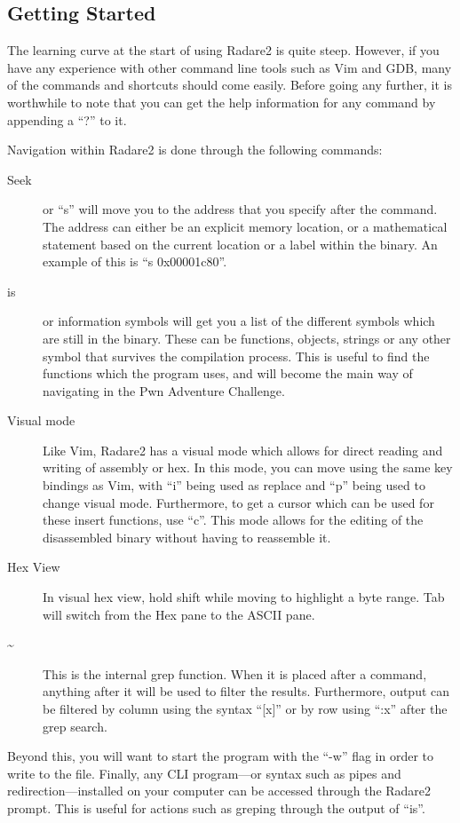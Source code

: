 \documentclass[a4paper,11pt]{report}
\begin{document}
		\subsection{Getting Started}
			The learning curve at the start of using Radare2 is quite steep. 
			However, if you have any experience with other command line tools such as Vim and GDB, many of the commands and shortcuts should come easily. 
			Before going any further, it is worthwhile to note that you can get the help information for any command by appending a ``?'' to it. 

			Navigation within Radare2 is done through the following commands:
			\begin{description}
				\item[Seek]
					or ``s'' will move you to the address that you specify after the command. 
					The address can either be an explicit memory location, or a mathematical statement based on the current location or a label within the binary. 
					An example of this is ``s 0x00001c80''.
				\item[is]
					or information symbols will get you a list of the different symbols which are still in the binary. 
					These can be functions, objects, strings or any other symbol that survives the compilation process. 
					This is useful to find the functions which the program uses, and will become the main way of navigating in the Pwn Adventure Challenge. 
				\item[Visual mode]
					Like Vim, Radare2 has a visual mode which allows for direct reading and writing of assembly or hex. 
					In this mode, you can move using the same key bindings as Vim, with ``i'' being used as replace and ``p'' being used to change visual mode. 
					Furthermore, to get a cursor which can be used for these insert functions, use ``c''.
					This mode allows for the editing of the disassembled binary without having to reassemble it. 
				\item[Hex View]
					In visual hex view, hold shift while moving to highlight a byte range. 
					Tab will switch from the Hex pane to the ASCII pane. 
				\item[\~{}]
					This is the internal grep function. 
					When it is placed after a command, anything after it will be used to filter the results. 
					Furthermore, output can be filtered by column using the syntax ``[x]'' or by row using ``:x'' after the grep search.
			\end{description}
			Beyond this, you will want to start the program with the ``-w'' flag in order to write to the file. 
			Finally, any CLI program---or syntax such as pipes and redirection---installed on your computer can be accessed through the Radare2 prompt. 
			This is useful for actions such as greping through the output of ``is''. 
\end{document}
